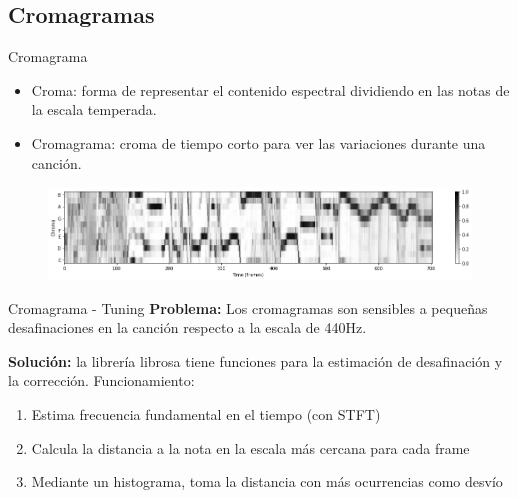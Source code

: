 \documentclass{beamer}
\begin{document}

\subsection{Cromagramas}

\begin{frame}{Cromagrama}
    \begin{itemize}
        \item Croma: forma de representar el contenido espectral dividiendo en las notas de la escala temperada.
        \item Cromagrama: croma de tiempo corto para ver las variaciones durante una canción.
    \end{itemize}

    \begin{figure}
        \centering
        \includegraphics[width=\textwidth]{chromas/bo_cartero_trama.png}
    \end{figure}
    
\end{frame}

\begin{frame}{Cromagrama - Tuning}
    \textbf{Problema:}
    Los cromagramas son sensibles a pequeñas desafinaciones en la canción respecto a la escala de 440Hz.
    
    \vfill
    
    \textbf{Solución:} la librería librosa tiene funciones para la estimación de desafinación y la corrección. Funcionamiento:
    \begin{enumerate}
        \item Estima frecuencia fundamental en el tiempo (con STFT)
        \item Calcula la distancia a la nota en la escala más cercana para cada frame
        \item Mediante un histograma, toma la distancia con más ocurrencias como desvío
    \end{enumerate}
    
\end{frame}
\end{document}
